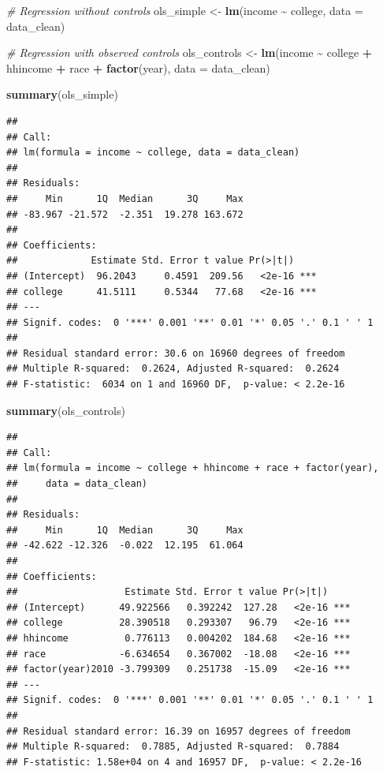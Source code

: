 \documentclass[
]{article}
\newenvironment{Shaded}{\begin{snugshade}}{\end{snugshade}}
\newcommand{\AttributeTok}[1]{\textcolor[rgb]{0.13,0.29,0.53}{#1}}
\newcommand{\CommentTok}[1]{\textcolor[rgb]{0.56,0.35,0.01}{\textit{#1}}}
\newcommand{\FunctionTok}[1]{\textcolor[rgb]{0.13,0.29,0.53}{\textbf{#1}}}
\newcommand{\NormalTok}[1]{#1}
\newcommand{\OtherTok}[1]{\textcolor[rgb]{0.56,0.35,0.01}{#1}}
\newcommand{\SpecialCharTok}[1]{\textcolor[rgb]{0.81,0.36,0.00}{\textbf{#1}}}
\begin{document}
\begin{Shaded}
\begin{Highlighting}[]
\CommentTok{\# Regression without controls}
\NormalTok{ols\_simple }\OtherTok{\textless{}{-}} \FunctionTok{lm}\NormalTok{(income }\SpecialCharTok{\textasciitilde{}}\NormalTok{ college, }\AttributeTok{data =}\NormalTok{ data\_clean)}

\CommentTok{\# Regression with observed controls}
\NormalTok{ols\_controls }\OtherTok{\textless{}{-}} \FunctionTok{lm}\NormalTok{(income }\SpecialCharTok{\textasciitilde{}}\NormalTok{ college }\SpecialCharTok{+}\NormalTok{ hhincome }\SpecialCharTok{+}\NormalTok{ race }\SpecialCharTok{+} \FunctionTok{factor}\NormalTok{(year),}
                   \AttributeTok{data =}\NormalTok{ data\_clean)}

\FunctionTok{summary}\NormalTok{(ols\_simple)}
\end{Highlighting}
\end{Shaded}

\begin{verbatim}
## 
## Call:
## lm(formula = income ~ college, data = data_clean)
## 
## Residuals:
##     Min      1Q  Median      3Q     Max 
## -83.967 -21.572  -2.351  19.278 163.672 
## 
## Coefficients:
##             Estimate Std. Error t value Pr(>|t|)    
## (Intercept)  96.2043     0.4591  209.56   <2e-16 ***
## college      41.5111     0.5344   77.68   <2e-16 ***
## ---
## Signif. codes:  0 '***' 0.001 '**' 0.01 '*' 0.05 '.' 0.1 ' ' 1
## 
## Residual standard error: 30.6 on 16960 degrees of freedom
## Multiple R-squared:  0.2624, Adjusted R-squared:  0.2624 
## F-statistic:  6034 on 1 and 16960 DF,  p-value: < 2.2e-16
\end{verbatim}

\begin{Shaded}
\begin{Highlighting}[]
\FunctionTok{summary}\NormalTok{(ols\_controls)}
\end{Highlighting}
\end{Shaded}

\begin{verbatim}
## 
## Call:
## lm(formula = income ~ college + hhincome + race + factor(year), 
##     data = data_clean)
## 
## Residuals:
##     Min      1Q  Median      3Q     Max 
## -42.622 -12.326  -0.022  12.195  61.064 
## 
## Coefficients:
##                   Estimate Std. Error t value Pr(>|t|)    
## (Intercept)      49.922566   0.392242  127.28   <2e-16 ***
## college          28.390518   0.293307   96.79   <2e-16 ***
## hhincome          0.776113   0.004202  184.68   <2e-16 ***
## race             -6.634654   0.367002  -18.08   <2e-16 ***
## factor(year)2010 -3.799309   0.251738  -15.09   <2e-16 ***
## ---
## Signif. codes:  0 '***' 0.001 '**' 0.01 '*' 0.05 '.' 0.1 ' ' 1
## 
## Residual standard error: 16.39 on 16957 degrees of freedom
## Multiple R-squared:  0.7885, Adjusted R-squared:  0.7884 
## F-statistic: 1.58e+04 on 4 and 16957 DF,  p-value: < 2.2e-16
\end{verbatim}
\end{document}
